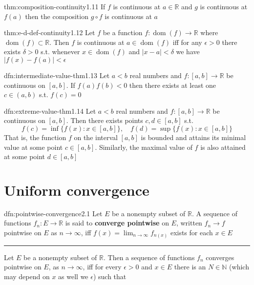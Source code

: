\documentclass[landscape, 8pt]{extarticle}
\DeclareMathOperator{\dom}{dom}
\begin{document}
\begin{multicols}{3}
\begin{thm}{thm:composition-continuity}{1.11}
	If $f$ is continuous at $a\in \mathbb{R}$ and $g$ is continuous at $f(a)$ then the composition $g \circ f$ is continuous at $a$
\end{thm}

\begin{thm}{thm:e-d-def-continuity}{1.12}
	Let $f$ be a function $f : \dom(f) \to \mathbb{R}$ where $\dom(f) \subset \mathbb{R}$. Then $f$ is continuous at $a\in \dom(f)$ iff for any $\epsilon > 0$ there exists $\delta > 0$ s.t. whenever $x\in\dom(f)$ and $\lvert x - a \rvert < \delta$ we have $\lvert f(x) - f(a) \rvert < \epsilon$
\end{thm}

\begin{dfn}{dfn:intermediate-value-thm}{1.13}
	Let $a < b$ real numbers and $f : [a, b] \to \mathbb{R}$ be continuous on $[a, b]$. If $f(a)f(b)<0$ then there exists at least one $c\in (a, b)$ s.t. $f(c) = 0$
\end{dfn}

\begin{dfn}{dfn:extreme-value-thm}{1.14}
	Let $a < b$ real numbers and $f : [a, b]\to \mathbb{R}$ be continuous on $[a, b]$. Then there exists points $c, d\in [a,b]$ s.t.
	\[f(c) = \inf \{f(x) : x\in [a, b]\}, \quad f(d) = \sup \{f(x) : x\in [a, b]\}\]
	That is, the function $f$ on the interval $[a, b]$ is bounded and attains its minimal value at some point $c\in [a,b]$. Similarly, the maximal value of $f$ is also attained at some point $d\in [a,b]$
\end{dfn}


\section{Uniform convergence}

\begin{dfn}{dfn:pointwise-convergence}{2.1}
	Let $E$ be a nonempty subset of $\mathbb{R}$. A sequence of functions $f_{n}: E\to \mathbb{R}$ is said to \textbf{converge pointwise} on $E$, written $f_{n}\to f$ pointwise on $E$ as $n\to \infty$, iff $f(x) = \displaystyle\lim_{n \to \infty}f_{n(x)}$ exists for each $x \in E$

	\noindent\rule{\textwidth}{0.2pt}
	Let $E$ be a nonempty subset of $\mathbb{R}$. Then a sequence of functions $f_{n}$ converges pointwise on $E$, as $n\to\infty$, iff for every $\epsilon>0$ and $x \in E$ there is an $N \in\mathbb{N}$ (which may depend on $x$ as well we $\epsilon$) such that


\end{dfn}
\end{multicols}
\end{document}
